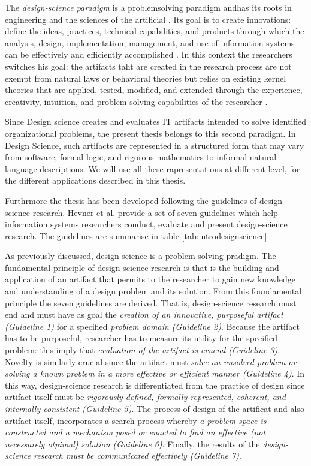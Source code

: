 \documentclass[]{book}
\begin{document}
The \emph{design-science paradigm} is a problemsolving paradigm andhas
its roots in engineering and the sciences of the artificial
\citep{simon1996sciences}. Its goal is to create innovations: define the
ideas, practices, technical capabilities, and products through which the
analysis, design, implementation, management, and use of information
systems can be effectively and efficiently accomplished
\citep{denning1997new, tsichritzis1997dynamics}. In this context the
researchers switches his goal: the artifacts taht are created in the
research process are not exempt from natural laws or behavioral theories
but relies on existing kernel theories that are applied, tested,
modified, and extended through the experience, creativity, intuition,
and problem solving capabilities of the researcher
\citep{markus2002design, walls1992building}.

Since Design science creates and evaluates IT artifacts intended to
solve identified organizational problems, the present thesis belongs to
this second paradigm. In Design Science, such artifacts are represented
in a structured form that may vary from software, formal logic, and
rigorous mathematics to informal natural language descriptions. We will
use all these rapresentations at different level, for the different
applications described in this thesis.

Furthrmore the thesis has been developed following the guidelines of
design-science research. Hevner et al. \citep{bichler2006design} provide
a set of seven guidelines which help information systems researchers
conduct, evaluate and present design-science research. The guidelines
are summarise in table \ref{tab:introdesignscience}.

As previously discussed, design science is a problem solving pradigm.
The fundamental principle of design-science research is that is the
building and application of an artifact that permits to the researcher
to gain new knowledge and understanding of a design problem and its
solution. From this foundamental principle the seven guidelines are
derived. That is, design-science research must end and must have as goal
the \emph{creation of an innovative, purposeful artifact (Guideline 1)}
for a specified \emph{problem domain (Guideline 2)}. Because the
artifact has to be purposeful, researcher has to measure its utility for
the specified problem: this imply that \emph{evaluation of the artifact
is crucial (Guideline 3)}. Novelty is similarly crucial since the
artifact must \emph{solve an unsolved problem or solving a known problem
in a more effective or efficient manner (Guideline 4)}. In this way,
design-science research is differentiated from the practice of design
since artifact itself must be \emph{rigorously defined, formally
represented, coherent, and internally consistent (Guideline 5)}. The
process of design of the artificat and also artifact itself,
incorporates a search process whereby \emph{a problem space is
constructed and a mechanism posed or enacted to find an effective (not
necessarely otpimal) solution (Guideline 6)}. Finally, the results of
the \emph{design-science research must be communicated effectively
(Guideline 7)}.
\end{document}
